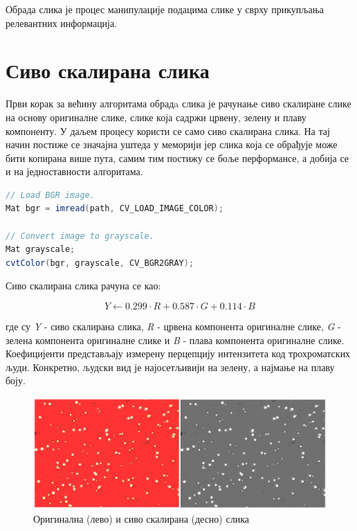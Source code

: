 \documentclass[12pt,a4paper,serbian,oneside]{book}
\begin{document}
Обрада слика је процес манипулације подацима слике у сврху прикупљања релевантних информација.

\section{Сиво скалирана слика}

Први корак за већину алгоритама обрадa слика је рачунање сиво скалиране слике на основу оригиналне слике, слике која садржи црвену, зелену и плаву компоненту. У даљем процесу користи се само сиво скалирана слика. На тај начин  постиже се значајна уштеда у меморији јер слика која се обрађује може бити копирана више пута, самим тим постижу се боље перформансе,  а добија се и на једноставности алгоритама.

\begin{lstlisting}[language=Java,label=lst:grayscale,caption=Рачунање сиво скалиране слике]
// Load BGR image.
Mat bgr = imread(path, CV_LOAD_IMAGE_COLOR);

// Convert image to grayscale.
Mat grayscale;
cvtColor(bgr, grayscale, CV_BGR2GRAY);
\end{lstlisting}

 Сиво скалирана слика рачуна се као:

\begin{equation}
Y \gets 0.299 \cdot R + 0.587 \cdot G + 0.114 \cdot B
\end{equation}

где су \textit{Y} - сиво скалирана слика, \textit{R} - црвена компонента оригиналне слике, \textit{G} - зелена компонента оригиналне слике и \textit{B} - плава компонента оригиналне слике. Коефицијенти представљају измерену перцепцију интензитета код трохроматских људи. Конкретно, људски вид је најосетљивији на зелену, а најмање на плаву боју.

\begin{figure}
\begin{center}
\includegraphics[width=150mm]{images/original+grayscale.png}
\end{center}
\caption{Оригинална (лево) и сиво скалирана (десно) слика}
\label{fig:cv}
\end{figure}
\end{document}
